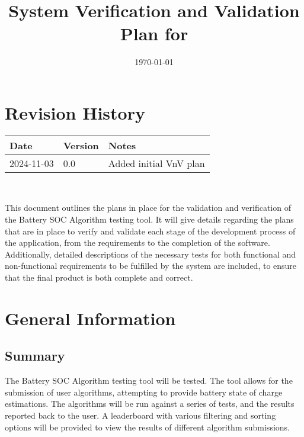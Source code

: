 \documentclass[12pt, titlepage]{article}
\begin{document}
\title{System Verification and Validation Plan for \progname{}} 
\author{\authname}
\date{\today}
	
\maketitle


\section*{Revision History}

\begin{tabularx}{\textwidth}{p{3cm}p{2cm}X}
\toprule {\bf Date} & {\bf Version} & {\bf Notes}\\
\midrule
2024-11-03 & 0.0 & Added initial VnV plan\\
\bottomrule
\end{tabularx}

~\\

\newpage

\tableofcontents

\listoftables

\newpage


This document outlines the plans in place for the validation and verification of the Battery SOC Algorithm testing tool. It will give details regarding the plans that are in place to verify and validate each stage of the development process of the application, from the requirements to the completion of the software. Additionally, detailed descriptions of the necessary tests for both functional and non-functional requirements to be fulfilled by the system are included, to ensure that the final product is both complete and correct.

\section{General Information}

\subsection{Summary}

The Battery SOC Algorithm testing tool will be tested. The tool allows for the submission of user algorithms, attempting to provide battery state of charge estimations. The algorithms will be run against a series of tests, and the results reported back to the user. A leaderboard with various filtering and sorting options will be provided to view the results of different algorithm submissions.
\end{document}
